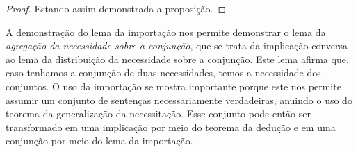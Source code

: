 \begin{tcolorbox}[enhanced jigsaw, breakable, sharp corners, colframe=black, colback=white, boxrule=0.5pt, left=1.5mm, right=1.5mm, top=1.5mm, bottom=1.5mm]
\begin{lemma}[Importação]
\begin{proof}
        \vspace{0.5\baselineskip}
        Estando assim demonstrada a proposição.
        \end{proof}
    \end{lemma}
\end{tcolorbox}

\vspace{.5\baselineskip}
A demonstração do lema da importação nos permite demonstrar o lema da \emph{agregação da necessidade sobre a conjunção}, que se trata da implicação conversa ao lema da distribuição da necessidade sobre a conjunção.
Este lema afirma que, caso tenhamos a conjunção de duas necessidades, temos a necessidade dos conjuntos.
O uso da importação se mostra importante porque este nos permite assumir um conjunto de sentenças necessariamente verdadeiras, anuindo o uso do teorema da generalização da necessitação.
Esse conjunto pode então ser transformado em uma implicação por meio do teorema da dedução e em uma conjunção por meio do lema da importação.

